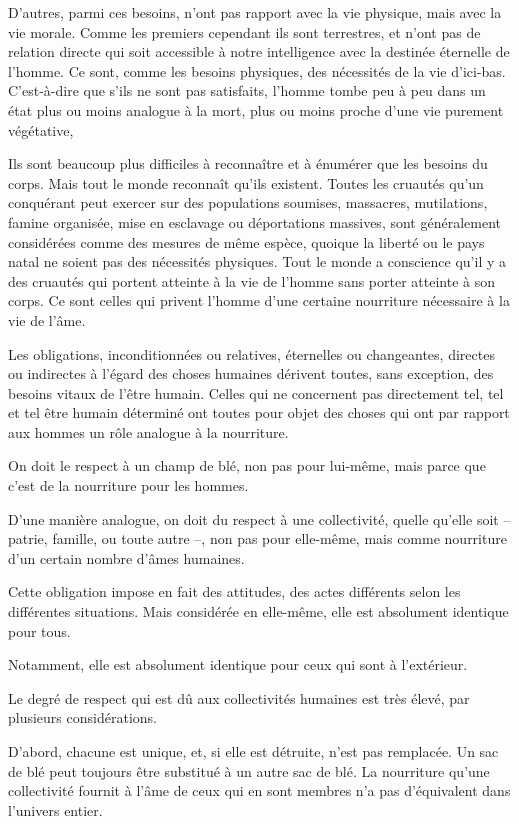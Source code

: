 \documentclass[french,twoside]{book} %
\begin{document}
D'autres, parmi ces besoins, n'ont pas rapport avec la vie physique, mais avec la vie morale. Comme les premiers cependant ils sont terrestres, et n'ont pas de relation directe qui soit accessible à notre intelligence avec la destinée éternelle de l'homme. Ce sont, comme les besoins physiques, des nécessités de la vie d'ici-bas. C'est-à-dire que s'ils ne sont pas satisfaits, l'homme tombe peu à peu dans un état plus ou moins analogue à la mort, plus ou moins proche d'une vie purement végétative,\par
Ils sont beaucoup plus difficiles à reconnaître et à énumérer que les besoins du corps. Mais tout le monde reconnaît qu'ils existent. Toutes les cruautés qu'un conquérant peut exercer sur des populations soumises, massacres, mutilations, famine organisée, mise en esclavage ou déportations massives, sont généralement considérées comme des mesures de même espèce, quoique la liberté ou le pays natal ne soient pas des nécessités physiques. Tout le monde a conscience qu'il y a des cruautés qui portent atteinte à la vie de l'homme sans porter atteinte à son corps. Ce sont celles qui privent l'homme d'une certaine nourriture nécessaire à la vie de l'âme.\par
Les obligations, inconditionnées ou relatives, éternelles ou changeantes, directes ou indirectes à l'égard des choses humaines dérivent toutes, sans exception, des besoins vitaux de l'être humain. Celles qui ne concernent pas directement tel, tel et tel être humain déterminé ont toutes pour objet des choses qui ont par rapport aux hommes un rôle analogue à la nourriture.\par
On doit le respect à un champ de blé, non pas pour lui-même, mais parce que c'est de la nourriture pour les hommes.\par
D'une manière analogue, on doit du respect à une collectivité, quelle qu'elle soit – patrie, famille, ou toute autre –, non pas pour elle-même, mais comme nourriture d'un certain nombre d'âmes humaines.\par
Cette obligation impose en fait des attitudes, des actes différents selon les différentes situations. Mais considérée en elle-même, elle est absolument identique pour tous.\par
Notamment, elle est absolument identique pour ceux qui sont à l'extérieur.\par
Le degré de respect qui est dû aux collectivités humaines est très élevé, par plusieurs considérations.\par
D'abord, chacune est unique, et, si elle est détruite, n'est pas remplacée. Un sac de blé peut toujours être substitué à un autre sac de blé. La nourriture qu'une collectivité fournit à l'âme de ceux qui en sont membres n'a pas d'équivalent dans l'univers entier.\par
\end{document}
